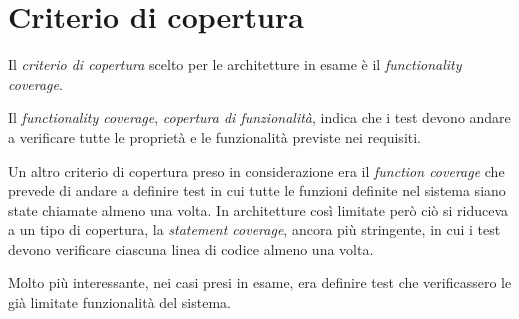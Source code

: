 \section{Criterio di copertura}

Il \emph{criterio di copertura} scelto per le architetture in esame è il \emph{functionality coverage}.

Il \emph{functionality coverage}, \emph{copertura di funzionalità}, indica che i test devono andare a verificare tutte le proprietà e le funzionalità previste nei requisiti.

Un altro criterio di copertura preso in considerazione era il \emph{function coverage} che prevede di andare a definire test in cui tutte le funzioni definite nel sistema siano state chiamate almeno una volta. In architetture così limitate però ciò si riduceva a un tipo di copertura, la \emph{statement coverage}, ancora più stringente, in cui i test devono verificare ciascuna linea di codice almeno una volta. 

Molto più interessante, nei casi presi in esame, era definire test che verificassero le già limitate funzionalità del sistema.